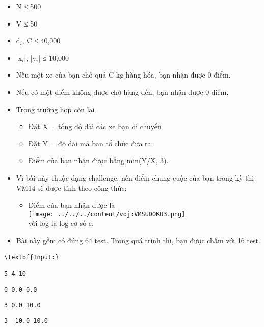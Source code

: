 \begin{itemize}
	\item N ≤ 500
	\item V ≤ 50
	\item d$_i$, C ≤ 40,000
	\item |x$_i$|, |y$_i$| ≤ 10,000
\end{itemize}
\begin{itemize}
	\item Nếu một xe của bạn chở quá C kg hàng hóa, bạn nhận được 0 điểm.
	\item Nếu có một điểm không được chở hàng đến, bạn nhận được 0 điểm.
	\item Trong trường hợp còn lại                                 

 
\begin{itemize}
	\item Đặt X = tổng độ dài các xe bạn di chuyển
	\item Đặt Y = độ dài mà ban tổ chức đưa ra.
	\item Điểm của bạn nhận được bằng min(Y/X, 3).
\end{itemize}
	\item Vì bài này thuộc dạng challenge, nên điểm chung cuộc của bạn trong kỳ thi VM14 sẽ được tính theo công thức:                             


\begin{itemize}
item Giả sử điểm của bạn đứng thứ i (nghĩa là có i-1 người điểm cao hơn bạn).
	\item Điểm của bạn nhận được là  
\\
\texttt{[image: ../../../content/voj:VMSUDOKU3.png]}
\\ với log là log cơ số e.
\end{itemize}
	\item Bài này gồm có đúng 64 test. Trong quá trình thi, bạn được chấm với 16 test.                  

 
\begin{itemize}
\end{itemize}
\end{itemize}
\begin{verbatim}
\textbf{Input:}

5 4 10\end{verbatim}
\begin{verbatim}
0 0.0 0.0\end{verbatim}
\begin{verbatim}
3 0.0 10.0\end{verbatim}
\begin{verbatim}
3 -10.0 10.0\end{verbatim}
